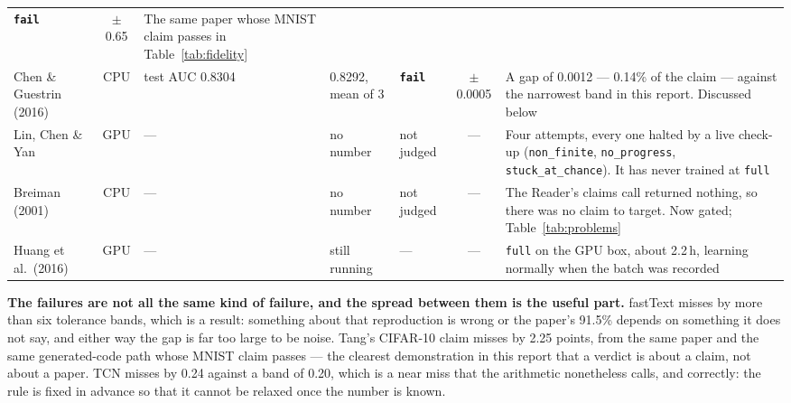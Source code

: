 \documentclass[11pt]{article}
\begin{document}
\begin{table}[tbp]
\begin{tabular}{L{0.175\textwidth}cL{0.115\textwidth}L{0.13\textwidth}L{0.075\textwidth}cL{0.235\textwidth}}
  \textbf{\texttt{fail}} & $\pm$0.65 & The same paper whose MNIST claim passes in
  Table~\ref{tab:fidelity} \\
Chen \& Guestrin (2016) \cite{chen2016xgboost} & CPU & test AUC 0.8304 & 0.8292, mean of 3 &
  \textbf{\texttt{fail}} & $\pm$0.0005 & A gap of 0.0012 --- 0.14\% of the claim --- against the
  narrowest band in this report. Discussed below \\
\midrule
Lin, Chen \& Yan \cite{lin2014nin} & GPU & --- & no number & not judged & --- & Four attempts,
  every one halted by a live check-up (\texttt{non\_finite}, \texttt{no\_progress},
  \texttt{stuck\_at\_chance}). It has never trained at \texttt{full} \\
Breiman (2001) \cite{breiman2001rf} & CPU & --- & no number & not judged & --- & The Reader's
  claims call returned nothing, so there was no claim to target. Now gated;
  Table~\ref{tab:problems} \\
Huang et al.\ (2016) \cite{huang2016stochastic} & GPU & --- & still running & --- & --- &
  \texttt{full} on the GPU box, about 2.2\,h, learning normally when the batch was recorded \\
\bottomrule
\end{tabular}
\end{table}

\textbf{The failures are not all the same kind of failure, and the spread between them is the
useful part.} fastText misses by more than six tolerance bands, which is a result: something
about that reproduction is wrong or the paper's 91.5\% depends on something it does not say, and
either way the gap is far too large to be noise. Tang's CIFAR-10 claim misses by 2.25 points,
from the same paper and the same generated-code path whose MNIST claim passes --- the clearest
demonstration in this report that a verdict is about a claim, not about a paper. TCN misses by
0.24 against a band of 0.20, which is a near miss that the arithmetic nonetheless calls, and
correctly: the rule is fixed in advance so that it cannot be relaxed once the number is known.
\end{document}
